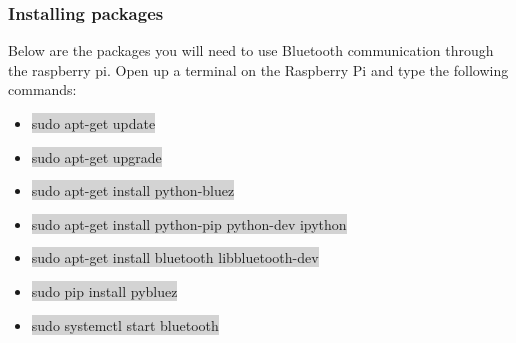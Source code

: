 \documentclass[12pt]{article}
\begin{document}
%
%
%

\subsubsection{Installing packages}
Below are the packages you will need to use Bluetooth communication through the raspberry pi. Open up a terminal on the Raspberry Pi  and type the following commands:
\begin{itemize}
	\item[] \colorbox{lightgray}{sudo apt-get update}
	\item[] \colorbox{lightgray}{sudo apt-get upgrade}
	\item[] \colorbox{lightgray}{sudo apt-get install python-bluez}
	\item[] \colorbox{lightgray}{sudo apt-get install python-pip python-dev ipython}
	\item[] \colorbox{lightgray}{sudo apt-get install bluetooth libbluetooth-dev}
	\item[] \colorbox{lightgray}{sudo pip install pybluez}
	\item[] \colorbox{lightgray}{sudo systemctl start bluetooth}

\end{itemize}
\end{document}
